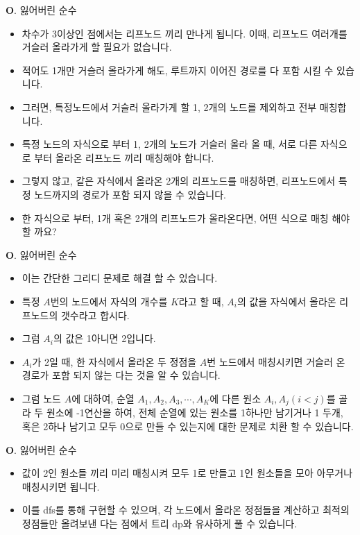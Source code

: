 \begin{frame}{\textbf{O}. 잃어버린 순수}
    \begin{itemize}
        \item 차수가 3이상인 점에서는 리프노드 끼리 만나게 됩니다. 이때, 리프노드 여러개를 거슬러 올라가게 할 필요가 없습니다.
        \item 적어도 1개만 거슬러 올라가게 해도, 루트까지 이어진 경로를 다 포함 시킬 수 있습니다.
        \item 그러면, 특정노드에서 거슬러 올라가게 할 1, 2개의 노드를 제외하고 전부 매칭합니다.
        \item 특정 노드의 자식으로 부터 1, 2개의 노드가 거슬러 올라 올 때, 서로 다른 자식으로 부터 올라온 리프노드 끼리 매칭해야 합니다.
        \item 그렇지 않고, 같은 자식에서 올라온 2개의 리프노드를 매칭하면, 리프노드에서 특정 노드까지의 경로가 포함 되지 않을 수 있습니다.
        \item 한 자식으로 부터, 1개 혹은 2개의 리프노드가 올라온다면, 어떤 식으로 매칭 해야 할 까요?
    \end{itemize}
\end{frame}  

\begin{frame}{\textbf{O}. 잃어버린 순수}
    \begin{itemize}
        \item 이는 간단한 그리디 문제로 해결 할 수 있습니다.
        \item 특정 $A$번의 노드에서 자식의 개수를 $K$라고 할 때, $A_i$의 값을 자식에서 올라온 리프노드의 갯수라고 합시다.
        \item 그럼 $A_i$의 값은 1아니면 2입니다.
        \item $A_i$가 2일 때, 한 자식에서 올라온 두 정점을 $A$번 노드에서 매칭시키면 거슬러 온 경로가 포함 되지 않는 다는 것을 알 수 있습니다.
        \item 그럼 노드 $A$에 대하여, 순열 $A_1, A_2, A_3, \cdots, A_K$에 다른 원소 $A_i, A_j(i < j)$를 골라 두 원소에 -1연산을 하여, 전체 순열에 있는 원소를 1하나만 남기거나 1 두개, 혹은 2하나 남기고 모두 0으로 만들 수 있는지에 대한 문제로 치환 할 수 있습니다.


    \end{itemize}
\end{frame}


\begin{frame}{\textbf{O}. 잃어버린 순수}
    \begin{itemize}
        \item 값이 2인 원소들 끼리 미리 매칭시켜 모두 1로 만들고 1인 원소들을 모아 아무거나 매칭시키면 됩니다.
        \item 이를 dfs를 통해 구현할 수 있으며, 각 노드에서 올라온 정점들을 계산하고 최적의 정점들만 올려보낸 다는 점에서 트리 dp와 유사하게 풀 수 있습니다.


    \end{itemize}
\end{frame}